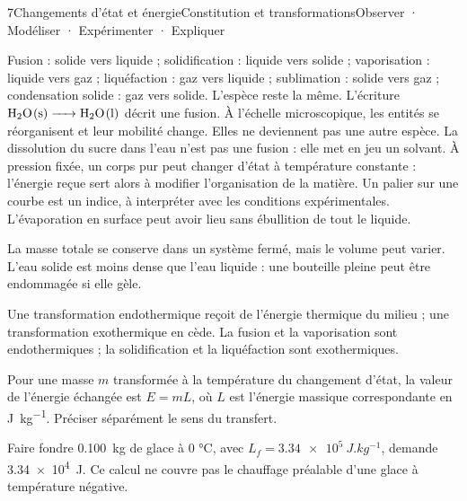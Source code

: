 \begin{ouverture}[thermo]{7}{Changements d’état et énergie}{Constitution et transformations}{Observer · Modéliser · Expérimenter · Expliquer}
\end{ouverture}
\essentiel
{}
Fusion : solide vers liquide ; solidification : liquide vers solide ; vaporisation : liquide vers gaz ; liquéfaction : gaz vers liquide ; sublimation : solide vers gaz ; condensation solide : gaz vers solide. L'espèce reste la même. L'écriture $\ce{H2O(s) -> H2O(l)}$ décrit une fusion.
À l'échelle microscopique, les entités se réorganisent et leur mobilité change. Elles ne deviennent pas une autre espèce. La dissolution du sucre dans l'eau n'est pas une fusion : elle met en jeu un solvant.
À pression fixée, un corps pur peut changer d'état à température constante : l'énergie reçue sert alors à modifier l'organisation de la matière. Un palier sur une courbe est un indice, à interpréter avec les conditions expérimentales. L'évaporation en surface peut avoir lieu sans ébullition de tout le liquide.
\begin{attention}La masse totale se conserve dans un système fermé, mais le volume peut varier. L'eau solide est moins dense que l'eau liquide : une bouteille pleine peut être endommagée si elle gèle.\end{attention}
Une transformation endothermique reçoit de l'énergie thermique du milieu ; une transformation exothermique en cède. La fusion et la vaporisation sont endothermiques ; la solidification et la liquéfaction sont exothermiques.
\begin{loi}Pour une masse $m$ transformée à la température du changement d'état, la valeur de l'énergie échangée est $E=mL$, où $L$ est l'énergie massique correspondante en \unit{J.kg^{-1}}. Préciser séparément le sens du transfert.\end{loi}
\begin{exemple}Faire fondre \qty{0,100}{kg} de glace à 0 °C, avec $L_f=\qty{3,34e5}{J.kg^{-1}}$, demande \qty{3,34e4}{J}. Ce calcul ne couvre pas le chauffage préalable d'une glace à température négative.\end{exemple}
